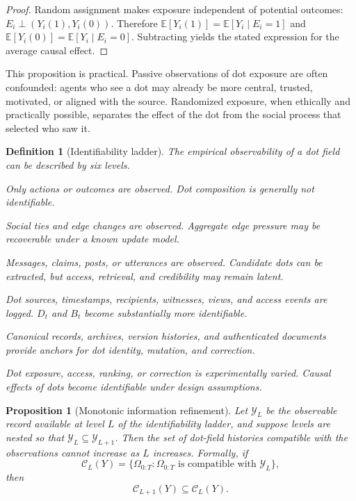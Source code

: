 \documentclass[11pt]{article}
\newtheorem{definition}{Definition}
\newtheorem{proposition}{Proposition}
\theoremstyle{remark}
\begin{document}
\begin{proof}
Random assignment makes exposure independent of potential outcomes:
$E_i\perp (Y_i(1),Y_i(0))$. Therefore
$\mathbb E[Y_i(1)]=\mathbb E[Y_i\mid E_i=1]$ and
$\mathbb E[Y_i(0)]=\mathbb E[Y_i\mid E_i=0]$. Subtracting yields the
stated expression for the average causal effect.
\end{proof}

This proposition is practical. Passive observations of dot exposure are
often confounded: agents who see a dot may already be more central,
trusted, motivated, or aligned with the source. Randomized exposure,
when ethically and practically possible, separates the effect of the dot
from the social process that selected who saw it.

\begin{definition}[Identifiability ladder]\label{def:identifiability-ladder}
The empirical observability of a dot field can be described by six
levels.

\begin{description}[leftmargin=2.8cm,style=nextline]
\item[Level 0: action-only] Only actions or outcomes are observed. Dot
composition is generally not identifiable.
\item[Level 1: edge-observed] Social ties and edge changes are observed.
Aggregate edge pressure may be recoverable under a known update model.
\item[Level 2: communication-observed] Messages, claims, posts, or
utterances are observed. Candidate dots can be extracted, but access,
retrieval, and credibility may remain latent.
\item[Level 3: provenance-access logged] Dot sources, timestamps,
recipients, witnesses, views, and access events are logged. $D_t$ and
$B_t$ become substantially more identifiable.
\item[Level 4: anchored-institutional] Canonical records, archives,
version histories, and authenticated documents provide anchors for dot
identity, mutation, and correction.
\item[Level 5: interventional] Dot exposure, access, ranking, or
correction is experimentally varied. Causal effects of dots become
identifiable under design assumptions.
\end{description}
\end{definition}

\begin{proposition}[Monotonic information refinement]\label{prop:monotonic-information-refinement}
Let $\mathcal Y_L$ be the observable record available at level $L$ of the
identifiability ladder, and suppose levels are nested so that
$\mathcal Y_L\subseteq\mathcal Y_{L+1}$. Then the set of dot-field
histories compatible with the observations cannot increase as $L$
increases. Formally, if
$$
\mathcal C_L(Y)=\{\Omega_{0:T}:\Omega_{0:T}\text{ is compatible with }\mathcal Y_L\},
$$
then
$$
\mathcal C_{L+1}(Y)\subseteq \mathcal C_L(Y).
$$
\end{proposition}
\end{document}
